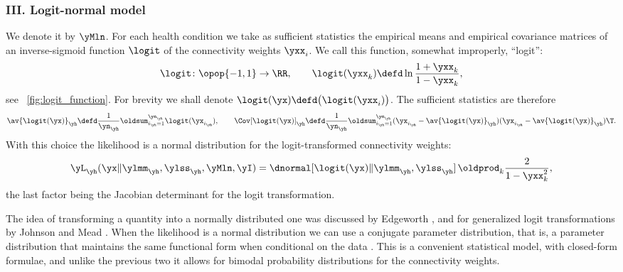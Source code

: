 \subsubsection{III. Logit-normal model}
\label{sec:logit-normal_model}

We denote it by $\yMln$. For each health condition we take as sufficient
statistics the empirical means and empirical covariance matrices of an
inverse-sigmoid function $\logit$ of the connectivity weights $\yxx_i$. We
call this function, somewhat improperly, \enquote{logit}:
\begin{equation}
  \label{eq:inv-logit}
\logit\colon \opop{-1,1} \to \RR, \qquad
  \logit(\yxx_k) \defd \ln\frac{1+\yxx_k}{1-\yxx_k},
\end{equation}
see \fig~\ref{fig:logit_function}. For brevity we shall denote
$\logit(\yx) \defd \bigl( \logit(\yxx_i) \bigr)$.
The sufficient statistics are therefore
\begin{equation}
  \label{eq:logit-normal_suff_stats}
  \av{\logit(\yx)}_{\yh} \defd \frac{1}{\yn_{\yh}}\oldsum_{i_{\yh}=1}^{\yn_{\yh}} \logit(\yx_{i_{\yh}}), \qquad
\Cov[\logit(\yx)]_{\yh} \defd  \frac{1}{\yn_{\yh}}\oldsum_{i_{\yh}=1}^{\yn_{\yh}}
  (\yx_{i_{\yh}}-\av{\logit(\yx)}_{\yh})(\yx_{i_{\yh}}-\av{\logit(\yx)}_{\yh})\T.
\end{equation}
With this choice the likelihood is a normal distribution for the
logit-transformed connectivity weights:
\begin{equation}
  \label{eq:logit-normal}
  \yL_{\yh}(\yx \| \ylmm_{\yh}, \ylss_{\yh}, \yMln, \yI)
=
\dnormal[\logit(\yx) \| \ylmm_{\yh}, \ylss_{\yh}]
\, \oldprod_k\frac{2}{1-\yxx_k^2},
\end{equation}
the last factor being the Jacobian determinant for the logit
transformation.

The idea of transforming a quantity into a normally distributed one was
discussed by Edgeworth , and for generalized logit
transformations by Johnson  and Mead .
When the likelihood is a normal distribution we can use a conjugate
parameter distribution, that is, a parameter distribution that maintains the same
functional form when conditional on the data
\citetext{\citealp[\chap~9]{degroot1970_r2004};
  \citealp{diaconisetal1979b}}. This is a convenient statistical model,
with closed-form formulae, and unlike the previous two it allows for
bimodal probability distributions for the connectivity weights.

